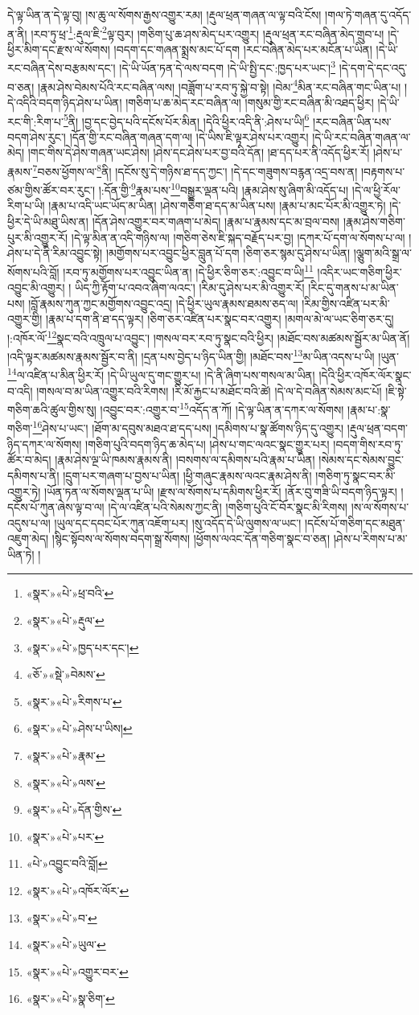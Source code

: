 དེ་ལྟ་ཡིན་ན་དེ་ལྟ་བུ། །ས་ཆུ་ལ་སོགས་རྒྱས་འགྱུར་རམ། །རྡུལ་ཕྲན་གཞན་ལ་ལྟ་བའི་ངོས། །གལ་ཏེ་གཞན་དུ་འདོད་ན་ནི། །རབ་ཏུ་ཕྲ་\footnote{«སྣར་»«པེ་»ཕྲ་བའི་}:རྡུལ་ཇི་\footnote{«སྣར་»«པེ་»རྡུལ་}ལྟ་བུར། །གཅིག་པུ་ཆ་ཤས་མེད་པར་འགྱུར། །རྡུལ་ཕྲན་རང་བཞིན་མེད་གྲུབ་པ། །དེ་ཕྱིར་མིག་དང་རྫས་ལ་སོགས། །བདག་དང་གཞན་སྨྲས་མང་པོ་དག །རང་བཞིན་མེད་པར་མངོན་པ་ཡིན། །དེ་ཡི་རང་བཞིན་དེས་བརྩམས་དང་། །དེ་ཡི་ཡོན་ཏན་དེ་ལས་བདག །དེ་ཡི་སྤྱི་དང་:ཁྱད་པར་ཡང་།\footnote{«སྣར་»«པེ་»ཁྱད་པར་དང་།} །དེ་དག་དེ་དང་འདུ་བ་ཅན། །རྣམ་ཤེས་བེམས་པོའི་རང་བཞིན་ལས། །བཟློག་པ་རབ་ཏུ་སྐྱེ་བ་སྟེ། །བེམ་\footnote{«ཅོ་»«སྡེ་»བེམས་}མིན་རང་བཞིན་གང་ཡིན་པ། །དེ་འདིའི་བདག་ཉིད་ཤེས་པ་ཡིན། །གཅིག་པ་ཆ་མེད་རང་བཞིན་ལ། །གསུམ་གྱི་རང་བཞིན་མི་འཐད་ཕྱིར། །དེ་ཡི་རང་གི་:རིག་པ་\footnote{«སྣར་»«པེ་»རིགས་པ་}ནི། །བྱ་དང་བྱེད་པའི་དངོས་པོར་མིན། །དེའི་ཕྱིར་འདི་ནི་:ཤེས་པ་ཡི།\footnote{«སྣར་»«པེ་»ཤེས་པ་ཡིས།} །རང་བཞིན་ཡིན་པས་བདག་ཤེས་རུང་། །དོན་གྱི་རང་བཞིན་གཞན་དག་ལ། །དེ་ཡིས་ཇི་ལྟར་ཤེས་པར་འགྱུར། །དེ་ཡི་རང་བཞིན་གཞན་ལ་མེད། །གང་གིས་དེ་ཤེས་གཞན་ཡང་ཤེས། །ཤེས་དང་ཤེས་པར་བྱ་བའི་དོན། །ཐ་དད་པར་ནི་འདོད་ཕྱིར་རོ། །ཤེས་པ་རྣམས་\footnote{«སྣར་»«པེ་»རྣམ་}བཅས་ཕྱོགས་ལ་\footnote{«སྣར་»«པེ་»ལས་}ནི། །དངོས་སུ་དེ་གཉིས་ཐ་དད་ཀྱང་། །དེ་དང་གཟུགས་བརྙན་འདྲ་བས་ན། །བརྟགས་པ་ཙམ་གྱིས་ཚོར་བར་རུང་། །:དོན་གྱི་\footnote{«སྣར་»«པེ་»དོན་གྱིས་}རྣམ་པས་\footnote{«སྣར་»«པེ་»པར་}བསྒྱུར་ལྡན་པའི། །རྣམ་ཤེས་སུ་ཞིག་མི་འདོད་པ། །དེ་ལ་ཕྱི་རོལ་རིག་པ་ཡི། །རྣམ་པ་འདི་ཡང་ཡོད་མ་ཡིན། །ཤེས་གཅིག་ཐ་དད་མ་ཡིན་པས། །རྣམ་པ་མང་པོར་མི་འགྱུར་ཏེ། །དེ་ཕྱིར་དེ་ཡི་མཐུ་ཡིས་ན། །དོན་ཤེས་འགྱུར་བར་གཞག་པ་མེད། །རྣམ་པ་རྣམས་དང་མ་བྲལ་བས། །རྣམ་ཤེས་གཅིག་པུར་མི་འགྱུར་རོ། །དེ་ལྟ་མིན་ན་འདི་གཉིས་ལ། །གཅིག་ཅེས་ཇི་སྐད་བརྗོད་པར་བྱ། །དཀར་པོ་དག་ལ་སོགས་པ་ལ། །ཤེས་པ་དེ་ནི་རིམ་འབྱུང་སྟེ། །མགྱོགས་པར་འབྱུང་ཕྱིར་བླུན་པོ་དག །ཅིག་ཅར་སྙམ་དུ་ཤེས་པ་ཡིན། །ལྕུག་མའི་སྒྲ་ལ་སོགས་པའི་བློ། །རབ་ཏུ་མགྱོགས་པར་འབྱུང་ཡིན་ན། །དེ་ཕྱིར་ཅིག་ཅར་:འབྱུང་བ་ཡི།\footnote{«པེ་»འབྱུང་བའི་བློ།} །འདིར་ཡང་གཅིག་ཕྱིར་འབྱུང་མི་འགྱུར། །
ཡིད་ཀྱི་རྟོག་པ་འབའ་ཞིག་ལའང་། །རིམ་དུ་ཤེས་པར་མི་འགྱུར་རོ། །རིང་དུ་གནས་པ་མ་ཡིན་པས། །བློ་རྣམས་ཀུན་ཀྱང་མགྱོགས་འབྱུང་འདྲ། །དེ་ཕྱིར་ཡུལ་རྣམས་ཐམས་ཅད་ལ། །རིམ་གྱིས་འཛིན་པར་མི་འགྱུར་གྱི། །རྣམ་པ་དག་ནི་ཐ་དད་ལྟར། །ཅིག་ཅར་འཛིན་པར་སྣང་བར་འགྱུར། །མགལ་མེ་ལ་ཡང་ཅིག་ཅར་དུ། །:འཁོར་ལོ་\footnote{«སྣར་»«པེ་»འཁོར་ལོར་}སྣང་བའི་འཁྲུལ་པ་འབྱུང་། །གསལ་བར་རབ་ཏུ་སྣང་བའི་ཕྱིར། །མཐོང་བས་མཚམས་སྦྱོར་མ་ཡིན་ནོ། །འདི་ལྟར་མཚམས་རྣམས་སྦྱོར་བ་ནི། །དྲན་པས་བྱེད་པ་ཉིད་ཡིན་གྱི། །མཐོང་བས་\footnote{«སྣར་»«པེ་»བ་}མ་ཡིན་འདས་པ་ཡི། །ཡུན་\footnote{«སྣར་»«པེ་»ཡུལ་}ལ་འཛིན་པ་མིན་ཕྱིར་རོ། །དེ་ཡི་ཡུལ་དུ་གང་གྱུར་པ། །དེ་ནི་ཞིག་པས་གསལ་མ་ཡིན། །དེའི་ཕྱིར་འཁོར་ལོར་སྣང་བ་འདི། །གསལ་བ་མ་ཡིན་འགྱུར་བའི་རིགས། །རི་མོ་རྐྱང་པ་མཐོང་བའི་ཚེ། །དེ་ལ་དེ་བཞིན་སེམས་མང་པོ། །ཇི་སྟེ་གཅིག་ཆའི་ཚུལ་གྱིས་སུ། །འབྱུང་བར་:འགྱུར་བ་\footnote{«སྣར་»«པེ་»འགྱུར་བར་}འདོད་ན་ཀོ། །དེ་ལྟ་ཡིན་ན་དཀར་ལ་སོགས། །རྣམ་པ་:སྣ་གཅིག་\footnote{«སྣར་»«པེ་»སྣ་ཅིག་}ཤེས་པ་ཡང་། །ཐོག་མ་དབུས་མཐའ་ཐ་དད་པས། །དམིགས་པ་སྣ་ཚོགས་ཉིད་དུ་འགྱུར། །རྡུལ་ཕྲན་བདག་ཉིད་དཀར་ལ་སོགས། །གཅིག་པུའི་བདག་ཉིད་ཆ་མེད་པ། །ཤེས་པ་གང་ལའང་སྣང་གྱུར་པར། །བདག་གིས་རབ་ཏུ་ཚོར་བ་མེད། །རྣམ་ཤེས་ལྔ་ཡི་ཁམས་རྣམས་ནི། །བསགས་ལ་དམིགས་པའི་རྣམ་པ་ཡིན། །སེམས་དང་སེམས་བྱུང་དམིགས་པ་ནི། །དྲུག་པར་གཞག་པ་བྱས་པ་ཡིན། །ཕྱི་གཞུང་རྣམས་ལའང་རྣམ་ཤེས་ནི། །གཅིག་ཏུ་སྣང་བར་མི་འགྱུར་ཏེ། །ཡོན་ཏན་ལ་སོགས་ལྡན་པ་ཡི། །རྫས་ལ་སོགས་པ་དམིགས་ཕྱིར་རོ། །ནོར་བུ་གཟི་ཡི་བདག་ཉིད་ལྟར། །དངོས་པོ་ཀུན་ཞེས་ལྟ་བ་ལ། །དེ་ལ་འཛིན་པའི་སེམས་ཀྱང་ནི། །གཅིག་པུའི་ངོ་བོར་སྣང་མི་རིགས། །ས་ལ་སོགས་པ་འདུས་པ་ལ། །ཡུལ་དང་དབང་པོར་ཀུན་འཇོག་པར། །སུ་འདོད་དེ་ཡི་ལུགས་ལ་ཡང་། །དངོས་པོ་གཅིག་དང་མཐུན་འཇུག་མེད། །སྙིང་སྟོབས་ལ་སོགས་བདག་སྒྲ་སོགས། །ཕྱོགས་ལའང་དོན་གཅིག་སྣང་བ་ཅན། །ཤེས་པ་རིགས་པ་མ་ཡིན་ཏེ། །
